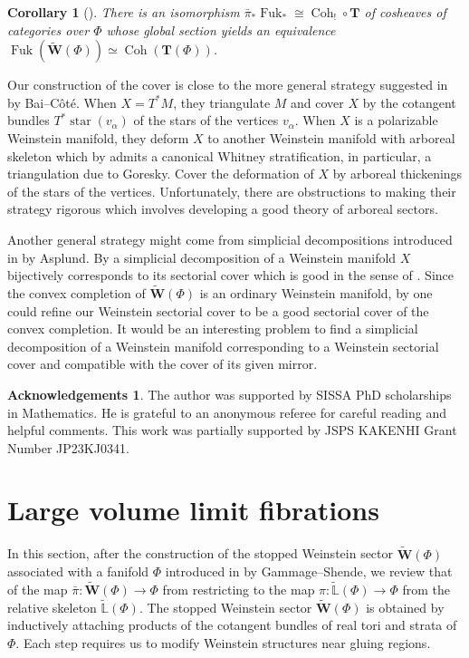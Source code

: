 \documentclass[a4paper,12pt, twoside, pdftex]{amsart}
\newtheorem{corollary}[dummy]{Corollary}
\theoremstyle{definition}
\newtheorem*{acknowledgements}{Acknowledgements}
\numberwithin{equation}{section}
\newcommand{\pref}{\prettyref}
\newcommand{\Coh}{\operatorname{Coh}}
\newcommand{\Fuk}{\operatorname{Fuk}}
\newcommand{\sstar}{\operatorname{star}}
\newcommand{\bL}{\mathbb{L}}
\newcommand{\bfT}{\mathbf{T}}
\newcommand{\bfW}{\mathbf{W}}
\begin{document}
\begin{corollary}[\pref{thm:HMS}]
There is an isomorphism
$\bar{\pi}_* \Fuk_*
\cong
\Coh_! \circ \bfT$
of cosheaves of categories over
$\Phi$
whose global section yields an equivalence
$\Fuk(\widetilde{\bfW}(\Phi))
\simeq
\Coh(\bfT(\Phi))$.
\end{corollary}

Our construction of the cover is close to the more general strategy suggested in
\cite{BC}
by Bai--Côté.
When
$X = T^* M$,
they triangulate
$M$
and
cover
$X$
by the cotangent bundles
$T^* \sstar(v_\alpha)$
of the stars of the vertices
$v_\alpha$.
When
$X$
is a polarizable Weinstein manifold,
they deform
$X$
to another Weinstein manifold with arboreal skeleton
which by
\cite[Section 4.2]{BC}
admits
a canonical Whitney stratification,
in particular,
a triangulation due to Goresky.
Cover the deformation of
$X$
by arboreal thickenings of the stars of the vertices. 
Unfortunately,
there are obstructions to making their strategy rigorous
which involves developing a good theory of arboreal sectors.
 
Another general strategy might come from simplicial decompositions
introduced in
\cite{Asp}
by Asplund.
By
\cite[Theorem 1.4]{Asp}
a simplicial decomposition of a Weinstein manifold
$X$
bijectively corresponds to its sectorial cover
which is good in the sense of
\cite[Section 1]{Asp}.
Since the convex completion of
$\widetilde{\bfW}(\Phi)$
is an ordinary Weinstein manifold,
by
\cite[Lemma 3.13]{Asp}
one could refine our Weinstein sectorial cover to be a good sectorial cover of the convex completion.
It would be an interesting problem to find a simplicial decomposition of a Weinstein manifold
corresponding to a Weinstein sectorial cover
and
compatible with the cover of its given mirror.

\begin{acknowledgements}
The author was supported by SISSA PhD scholarships in Mathematics.
He is grateful to an anonymous referee for careful reading and helpful comments.
This work was partially supported by
JSPS KAKENHI Grant Number
JP23KJ0341.  
\end{acknowledgements}

\section{Large volume limit fibrations} 
In this section,
after the construction of the stopped Weinstein sector
$\widetilde{\bfW}(\Phi)$
associated with a fanifold
$\Phi$
introduced in
\cite{GS1}
by Gammage--Shende,
we review that of the map
$\bar{\pi} \colon \widetilde{\bfW}(\Phi) \to \Phi$
from
\cite[Theorem 1.2]{Mor}
restricting to the map
$\pi \colon \widetilde{\bL}(\Phi) \to \Phi$
from the relative skeleton
$\widetilde{\bL}(\Phi)$.
The stopped Weinstein sector
$\widetilde{\bfW}(\Phi)$
is obtained by inductively attaching products of the cotangent bundles of
real tori
and
strata of
$\Phi$.
Each step requires us to modify Weinstein structures near gluing regions.
\end{document}
